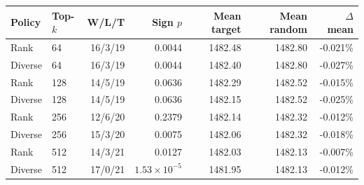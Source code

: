 \begin{tabular}{llrrrrr}
\toprule
Policy & Top-$k$ & W/L/T & Sign $p$ & Mean target & Mean random & $\Delta$ mean \\
\midrule
Rank & 64 & 16/3/19 & 0.0044 & 1482.48 & 1482.80 & -0.021\% \\
Diverse & 64 & 16/3/19 & 0.0044 & 1482.40 & 1482.80 & -0.027\% \\
Rank & 128 & 14/5/19 & 0.0636 & 1482.29 & 1482.52 & -0.015\% \\
Diverse & 128 & 14/5/19 & 0.0636 & 1482.15 & 1482.52 & -0.025\% \\
Rank & 256 & 12/6/20 & 0.2379 & 1482.14 & 1482.32 & -0.012\% \\
Diverse & 256 & 15/3/20 & 0.0075 & 1482.06 & 1482.32 & -0.018\% \\
Rank & 512 & 14/3/21 & 0.0127 & 1482.03 & 1482.13 & -0.007\% \\
Diverse & 512 & 17/0/21 & $1.53\times10^{-5}$ & 1481.95 & 1482.13 & -0.012\% \\
\bottomrule
\end{tabular}
